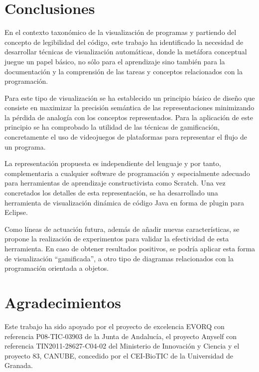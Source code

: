 \documentclass{llncs}
\begin{document}

\section{Conclusiones}
\label{sec:conclusions}

En el contexto taxonómico de la visualización de programas y partiendo del concepto de legibilidad del código, este trabajo ha identificado la necesidad de desarrollar técnicas de visualización automáticas, donde la metáfora conceptual juegue un papel básico, no sólo para el aprendizaje sino también para la documentación y la comprensión de las tareas y conceptos relacionados con la programación. 

Para este tipo de visualización se ha establecido un principio básico de diseño que consiste en maximizar la precisión semántica de las representaciones minimizando la pérdida de analogía con los conceptos representados.
Para la aplicación de este principio se ha comprobado la utilidad de las técnicas de gamificación, concretamente el uso de videojuegos de plataformas para representar el flujo de un programa.

La representación propuesta es independiente del lenguaje y por tanto, complementaria a cualquier software de programación y especialmente adecuado para herramientas de aprendizaje constructivista como Scratch. Una vez concretados los detalles de esta representación, se ha desarrollado una herramienta de visualización dinámica de código Java en forma de plugin para Eclipse. 

Como líneas de actuación futura, además de añadir nuevas características, se propone la realización de experimentos para validar la efectividad de esta herramienta. En caso de obtener resultados positivos, se podría aplicar esta forma de visualización ``gamificada'', a otro tipo de diagramas relacionados con la programación orientada a objetos. 




\section*{Agradecimientos}
Este trabajo ha sido apoyado por el proyecto de excelencia EVORQ con referencia P08-TIC-03903 de la Junta de Andalucía, el proyecto Anyself con referencia TIN2011-28627-C04-02 del Ministerio de Innovación y Ciencia y el proyecto 83, CANUBE, concedido por el CEI-BioTIC de la Universidad de Granada.





\end{document}
